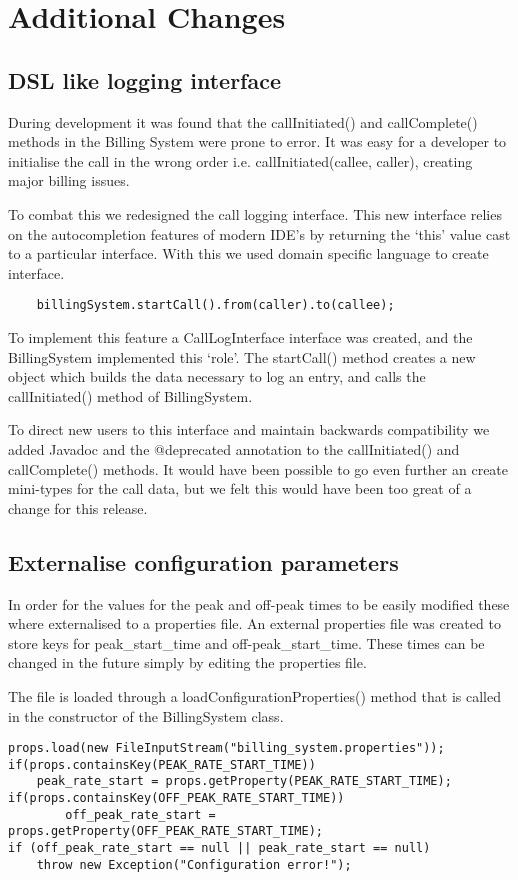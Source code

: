 \section{Additional Changes}

\subsection*{DSL like logging interface}
During development it was found that the callInitiated() and callComplete() methods in the Billing System were prone to error. It was easy for a developer to initialise the call in the wrong order i.e. callInitiated(callee, caller), creating major billing issues.

To combat this we redesigned the call logging interface. This new interface relies on the autocompletion features of modern IDE’s by returning the ‘this’ value cast to a particular interface. With this we used domain specific language to create interface.
\begin{lstlisting}
	billingSystem.startCall().from(caller).to(callee);
\end{lstlisting}
To implement this feature a CallLogInterface interface was created, and the BillingSystem implemented this ‘role’. The startCall() method creates a new object which builds the data necessary to log an entry, and calls the callInitiated() method of BillingSystem.

To direct new users to this interface and maintain backwards compatibility we added Javadoc and the @deprecated annotation to the callInitiated()  and callComplete() methods. It would have been possible to go even further an create mini-types for the call data, but we felt this would have been too great of a change for this release.

\subsection*{Externalise configuration parameters}
In order for the values for the peak and off-peak times to be easily modified these where externalised to a properties file. An external properties file was created to store keys for peak\_start\_time and off-peak\_start\_time. These times can be changed in the future simply by editing the properties file.

The file is loaded through a loadConfigurationProperties() method that is called in the constructor of the BillingSystem class. 

\begin{lstlisting}
props.load(new FileInputStream("billing_system.properties"));
if(props.containsKey(PEAK_RATE_START_TIME))
	peak_rate_start = props.getProperty(PEAK_RATE_START_TIME);	if(props.containsKey(OFF_PEAK_RATE_START_TIME))
     	off_peak_rate_start = props.getProperty(OFF_PEAK_RATE_START_TIME);
if (off_peak_rate_start == null || peak_rate_start == null)
	throw new Exception("Configuration error!");	
\end{lstlisting}

